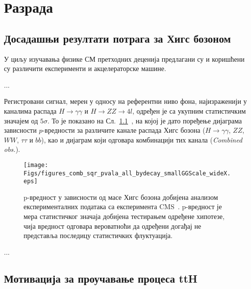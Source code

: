﻿%

\chapter{Разрада} %

\label{Разрада} %


\section{Досадашњи резултати потрага за Хигс бозоном}

У циљу изучавања физике СМ претходних деценија предлагани су и коришћени су различити експерименти и акцелераторске машине.

...

Регистровани сигнал, мерен у односу на референтни ниво фона, најизраженији у каналима распада $H\rightarrow\gamma\gamma$ и $H\rightarrow ZZ\rightarrow 4l$, одређен је са укупним статистичким значајем од $5\sigma$. То је показано на Сл.~\ref{fig:p-value_CMS}~\cite{Chatrchyan:2013lba}, на којој је дато поређење дијаграма зависности $p$-вредности за различите канале распада Хигс бозона ($H \rightarrow \gamma\gamma$, $ZZ$, $WW$, $\tau\tau$ и $bb$), као и дијаграм који одговара комбинацији тих канала (\textit{Combined obs.}).

\begin{figure}[H]
  \centering
	\texttt{[image: Figs/figures\_comb\_sqr\_pvala\_all\_bydecay\_smallGGScale\_wideX.eps]}
	\caption{p-вредност у зависности од масе Хигс бозона добијена анализом експерименталних података са експеримента CMS~\cite{Chatrchyan:2013lba}.
	p-вредност је мера статистичког значаја добијена тестирањем одређене хипотезе, чија вредност одговара вероватноћи да одређени догађај не представља последицу статистичких флуктуација.}
	\label{fig:p-value_CMS}
\end{figure}

...

\section{Мотивација за проучавање процеса ttH}

